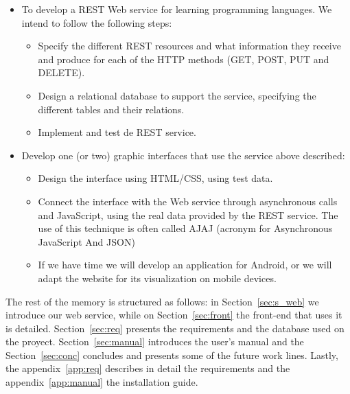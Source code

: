 \begin{itemize}
\item
To develop a REST Web service for learning programming languages. We intend to follow the following steps:

\begin{itemize}
\item
Specify the different REST resources and what information they receive and produce for each of the HTTP methods (GET, POST, PUT and DELETE).

\item
Design a relational database to support the service, specifying the different tables and their relations.

\item
Implement and test de REST service.

\end{itemize}

\item
Develop one (or two) graphic interfaces that use the service above described:

\begin{itemize}
\item
Design the interface using HTML/CSS, using test data.

\item
Connect the interface with the Web service through asynchronous calls and JavaScript, using the real data provided by the REST service. The use of this technique is often called AJAJ (acronym for Asynchronous JavaScript And JSON)

\item
If we have time we will develop an application for Android, or we will adapt the website for its visualization on mobile devices.

\end{itemize}

\end{itemize}

The rest of the memory is structured as follows: in Section~\ref{sec:s_web} we introduce our web service, while on Section~\ref{sec:front} the front-end that uses it is detailed.
Section~\ref{sec:req} presents the requirements and the database used on the proyect. Section~\ref{sec:manual} introduces the user's manual and the Section~\ref{sec:conc} concludes and presents some of the future work lines.
Lastly, the appendix~\ref{app:req} describes in detail the requirements and the appendix~\ref{app:manual} the installation guide.